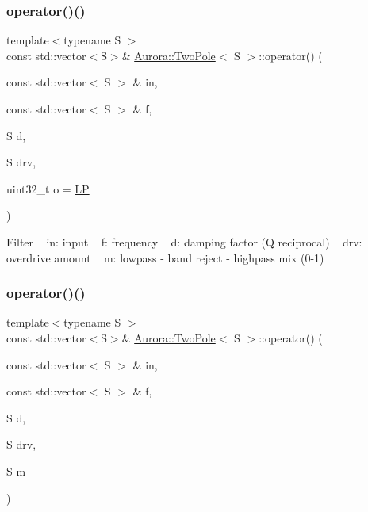 \subsubsection{\texorpdfstring{operator()()}{operator()()}\hspace{0.1cm}{\footnotesize\ttfamily [3/4]}}
{\footnotesize\ttfamily template$<$typename S $>$ \\
const std\+::vector$<$S$>$\& \hyperlink{class_aurora_1_1_two_pole}{Aurora\+::\+Two\+Pole}$<$ S $>$\+::operator() (\begin{DoxyParamCaption}\item[{const std\+::vector$<$ S $>$ \&}]{in,  }\item[{const std\+::vector$<$ S $>$ \&}]{f,  }\item[{S}]{d,  }\item[{S}]{drv,  }\item[{uint32\+\_\+t}]{o = {\ttfamily \hyperlink{namespace_aurora_a935301c39e9550e3c46ebe8dc165165faa9f81f17c7244e2198dba962e817cf89}{LP}} }\end{DoxyParamCaption})\hspace{0.3cm}{\ttfamily [inline]}}

Filter ~\newline
in\+: input ~\newline
f\+: frequency ~\newline
d\+: damping factor (Q reciprocal) ~\newline
drv\+: overdrive amount ~\newline
m\+: lowpass -\/ band reject -\/ highpass mix (0-\/1) ~\newline
\mbox{\label{class_aurora_1_1_two_pole_a776b342b83577db48d8037a219f36471}} 
\subsubsection{\texorpdfstring{operator()()}{operator()()}\hspace{0.1cm}{\footnotesize\ttfamily [4/4]}}
{\footnotesize\ttfamily template$<$typename S $>$ \\
const std\+::vector$<$S$>$\& \hyperlink{class_aurora_1_1_two_pole}{Aurora\+::\+Two\+Pole}$<$ S $>$\+::operator() (\begin{DoxyParamCaption}\item[{const std\+::vector$<$ S $>$ \&}]{in,  }\item[{const std\+::vector$<$ S $>$ \&}]{f,  }\item[{S}]{d,  }\item[{S}]{drv,  }\item[{S}]{m }\end{DoxyParamCaption})\hspace{0.3cm}{\ttfamily [inline]}}

